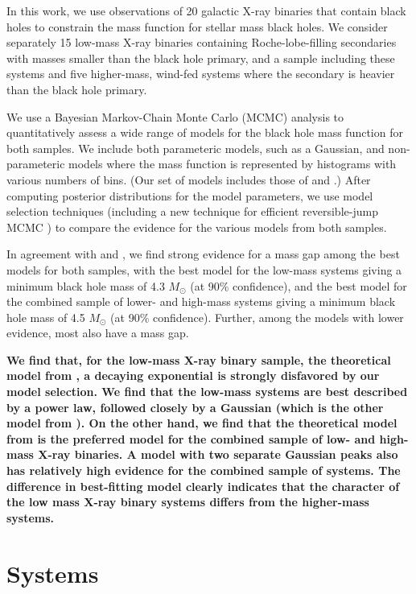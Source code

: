 \documentclass[preprint]{aastex}
\newcommand{\Msun}{M_\odot}
\newcommand{\changed}[1]{{\bf #1 }}
\begin{document}
In this work, we use observations of 20 galactic X-ray binaries that
contain black holes to constrain the mass function for stellar mass
black holes.  We consider separately 15 low-mass X-ray binaries
containing Roche-lobe-filling secondaries with masses smaller than the
black hole primary, and a sample including these systems and five
higher-mass, wind-fed systems where the secondary is heavier than the
black hole primary.

We use a Bayesian Markov-Chain Monte Carlo (MCMC) analysis to
quantitatively assess a wide range of models for the black hole mass
function for both samples.  We include both parameteric models, such
as a Gaussian, and non-parameteric models where the mass function is
represented by histograms with various numbers of bins.  (Our set of
models includes those of \citet{Ozel2010} and \citet{Bailyn1998}.)
After computing posterior distributions for the model parameters, we
use model selection techniques (including a new technique for
efficient reversible-jump MCMC \citep{Farr2010}) to compare the
evidence for the various models from both samples.

In agreement with \citet{Ozel2010} and \citet{Bailyn1998}, we find
strong evidence for a mass gap among the best models for both samples,
with the best model for the low-mass systems giving a minimum black
hole mass of 4.3 $\Msun$ (at 90\% confidence), and the best model for
the combined sample of lower- and high-mass systems giving a minimum
black hole mass of 4.5 $\Msun$ (at 90\% confidence).  Further, among
the models with lower evidence, most also have a mass gap.

\changed{We find that, for the low-mass X-ray binary sample, the
  theoretical model from \citet{Fryer2001}, a decaying exponential is
  strongly disfavored by our model selection.  We find that the
  low-mass systems are best described by a power law, followed
  closely by a Gaussian (which is the other model from
  \citet{Ozel2010}).  On the other hand, we find that the theoretical
  model from \citet{Fryer2001} is the preferred model for the combined
  sample of low- and high-mass X-ray binaries.  A model with two
  separate Gaussian peaks also has relatively high evidence for the
  combined sample of systems.  The difference in best-fitting model
  clearly indicates that the character of the low mass X-ray binary
  systems differs from the higher-mass systems.}

\section{Systems}
\label{sec:systems}
\end{document}
